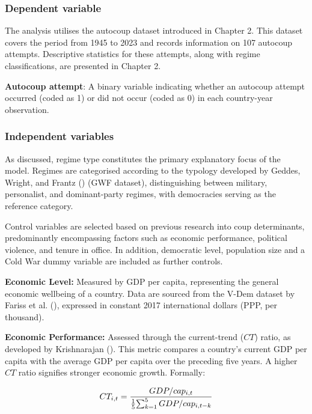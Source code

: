\documentclass[
  12pt,
]{report}
\begin{document}
\subsubsection*{Dependent variable}\label{dependent-variable}

The analysis utilises the autocoup dataset introduced in Chapter 2. This
dataset covers the period from 1945 to 2023 and records information on
107 autocoup attempts. Descriptive statistics for these attempts, along
with regime classifications, are presented in Chapter 2.

\textbf{Autocoup attempt}: A binary variable indicating whether an
autocoup attempt occurred (coded as 1) or did not occur (coded as 0) in
each country-year observation.

\subsubsection*{Independent variables}\label{independent-variables}

As discussed, regime type constitutes the primary explanatory focus of
the model. Regimes are categorised according to the typology developed
by Geddes, Wright, and Frantz () (GWF
dataset), distinguishing between military, personalist, and
dominant-party regimes, with democracies serving as the reference
category.

Control variables are selected based on previous research into coup
determinants, predominantly encompassing factors such as economic
performance, political violence, and tenure in office. In addition,
democratic level, population size and a Cold War dummy variable are
included as further controls.

\textbf{Economic Level:} Measured by GDP per capita, representing the
general economic wellbeing of a country. Data are sourced from the V-Dem
dataset by Fariss et al. (), expressed in
constant 2017 international dollars (PPP, per thousand).

\textbf{Economic Performance:} Assessed through the current-trend
(\(CT\)) ratio, as developed by Krishnarajan
(). This metric compares a
country's current GDP per capita with the average GDP per capita over
the preceding five years. A higher \(CT\) ratio signifies stronger
economic growth. Formally:

\[
    \begin{aligned}
    CT_{i,t} = {GDP/cap_{i,t} \over {1 \over 5} {\sum_{k=1}^5GDP/cap_{i,t-k}}}
    \end{aligned}
\]
\end{document}
